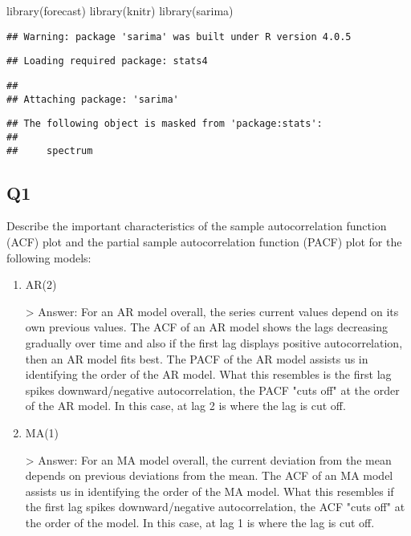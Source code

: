 \documentclass[
]{article}
\newenvironment{Shaded}{\begin{snugshade}}{\end{snugshade}}
\newcommand{\FunctionTok}[1]{\textcolor[rgb]{0.00,0.00,0.00}{#1}}
\newcommand{\NormalTok}[1]{#1}
\begin{document}
\begin{Shaded}
\begin{Highlighting}[]
\FunctionTok{library}\NormalTok{(forecast)}
\FunctionTok{library}\NormalTok{(knitr)}
\FunctionTok{library}\NormalTok{(sarima)}
\end{Highlighting}
\end{Shaded}

\begin{verbatim}
## Warning: package 'sarima' was built under R version 4.0.5
\end{verbatim}

\begin{verbatim}
## Loading required package: stats4
\end{verbatim}

\begin{verbatim}
## 
## Attaching package: 'sarima'
\end{verbatim}

\begin{verbatim}
## The following object is masked from 'package:stats':
## 
##     spectrum
\end{verbatim}

\hypertarget{q1}{%
\subsection{Q1}\label{q1}}

Describe the important characteristics of the sample autocorrelation
function (ACF) plot and the partial sample autocorrelation function
(PACF) plot for the following models:

\begin{enumerate}[label=(\alph*)]

\item AR(2)

> Answer: For an AR model overall, the series current values depend on its own previous values. The ACF of an AR model shows the lags decreasing gradually over time and also if the first lag displays positive autocorrelation, then an AR model fits best. The PACF of the AR model assists us in identifying the order of the AR model. What this resembles is the first lag spikes downward/negative autocorrelation, the PACF "cuts off" at the order of the AR model. In this case, at lag 2 is where the lag is cut off.

\item MA(1)

> Answer: For an MA model overall, the current deviation from the mean depends on previous deviations from the mean. The ACF of an MA model assists us in identifying the order of the MA model. What this resembles if the first lag spikes downward/negative autocorrelation, the ACF "cuts off" at the order of the model. In this case, at lag 1 is where the lag is cut off.

\end{enumerate}
\end{document}
